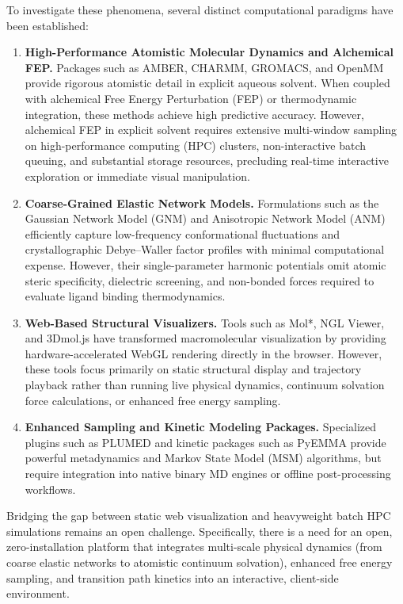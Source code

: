 \documentclass[journal=jpcbfk,manuscript=article,layout=twocolumn]{achemso}
\begin{document}
To investigate these phenomena, several distinct computational paradigms have been established:
\begin{enumerate}
\item \textbf{High-Performance Atomistic Molecular Dynamics and Alchemical FEP.} Packages such as AMBER,\cite{case2005amber} CHARMM,\cite{brooks1983charmm} GROMACS,\cite{abraham2015gromacs} and OpenMM\cite{eastman2017openmm} provide rigorous atomistic detail in explicit aqueous solvent. When coupled with alchemical Free Energy Perturbation (FEP) or thermodynamic integration,\cite{boresch2003absolute,mobley2017predicting} these methods achieve high predictive accuracy. However, alchemical FEP in explicit solvent requires extensive multi-window sampling on high-performance computing (HPC) clusters, non-interactive batch queuing, and substantial storage resources, precluding real-time interactive exploration or immediate visual manipulation.
\item \textbf{Coarse-Grained Elastic Network Models.} Formulations such as the Gaussian Network Model (GNM) and Anisotropic Network Model (ANM)\cite{bahar1997vibrational,atilgan2001anisotropy} efficiently capture low-frequency conformational fluctuations and crystallographic Debye--Waller factor profiles with minimal computational expense. However, their single-parameter harmonic potentials omit atomic steric specificity, dielectric screening, and non-bonded forces required to evaluate ligand binding thermodynamics.\cite{mobley2007predicting}
\item \textbf{Web-Based Structural Visualizers.} Tools such as Mol*,\cite{sehnal2021molstar} NGL Viewer,\cite{rose2018ngl} and 3Dmol.js\cite{rego20153dmol} have transformed macromolecular visualization by providing hardware-accelerated WebGL rendering directly in the browser. However, these tools focus primarily on static structural display and trajectory playback rather than running live physical dynamics, continuum solvation force calculations, or enhanced free energy sampling.
\item \textbf{Enhanced Sampling and Kinetic Modeling Packages.} Specialized plugins such as PLUMED\cite{tribello2014plumed} and kinetic packages such as PyEMMA\cite{prinz2011markov,noe2009constructing} provide powerful metadynamics and Markov State Model (MSM) algorithms, but require integration into native binary MD engines or offline post-processing workflows.
\end{enumerate}

Bridging the gap between static web visualization and heavyweight batch HPC simulations remains an open challenge. Specifically, there is a need for an open, zero-installation platform that integrates multi-scale physical dynamics (from coarse elastic networks to atomistic continuum solvation), enhanced free energy sampling, and transition path kinetics into an interactive, client-side environment.
\end{document}
